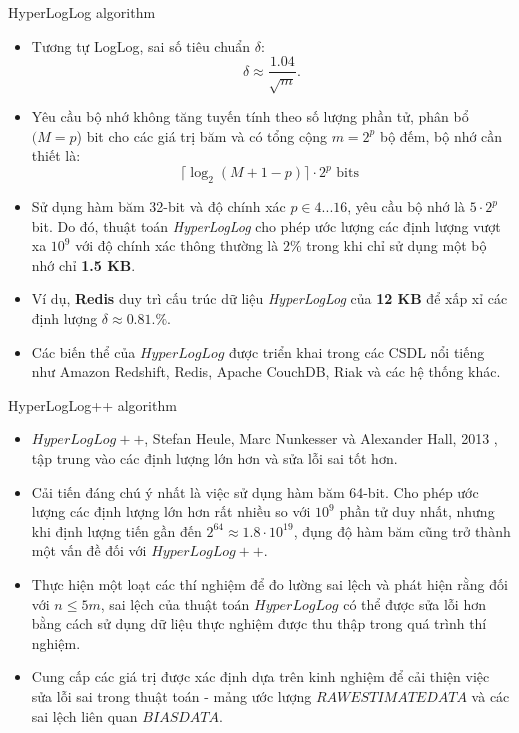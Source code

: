 \documentclass[10pt]{beamer}
\begin{document}
\begin{frame}{HyperLogLog algorithm}
\begin{itemize}
	\item Tương tự LogLog, sai số tiêu chuẩn $\delta$: \[\delta \approx \frac{1.04}{\sqrt{m}}.\]
	\item Yêu cầu bộ nhớ không tăng tuyến tính theo số lượng phần tử, phân bổ $(M=p$) bit cho các giá trị băm và có tổng cộng $m = 2^p$ bộ đếm, bộ nhớ cần thiết là:
  \[\lceil\log_2\left(M + 1 - p\right)\rceil\cdot2^p \text{ bits }\]
  \item Sử dụng hàm băm 32-bit và độ chính xác $p \in 4...16$, yêu cầu bộ nhớ là $5\cdot 2^p$ bit. Do đó, thuật toán \textit{HyperLogLog} cho phép ước lượng các định lượng vượt xa $10^9$ với độ chính xác thông thường là $2\%$ trong khi chỉ sử dụng một bộ nhớ chỉ \textbf{1.5 KB}.
  \item Ví dụ, \textbf{Redis} duy trì cấu trúc dữ liệu \textit{HyperLogLog} của \textbf{12 KB} để xấp xỉ các định lượng $\delta \approx 0.81.\%$.
  \item Các biến thể của $HyperLogLog$ được triển khai trong các CSDL nổi tiếng như Amazon Redshift, Redis, Apache CouchDB, Riak 
  và các hệ thống khác.
\end{itemize}
\end{frame}
\begin{frame}{HyperLogLog++ algorithm}
  \begin{itemize}
    \item $HyperLogLog++$, Stefan Heule, Marc Nunkesser và Alexander Hall, 2013 \cite{chabchoub2010sliding}, tập trung vào 
    các định lượng lớn hơn và sửa lỗi sai tốt hơn.
    \item Cải tiến đáng chú ý nhất là việc sử dụng hàm băm 64-bit. Cho phép 
    ước lượng các định lượng lớn hơn rất nhiều so với $10^9$ phần tử duy nhất, 
    nhưng khi định lượng tiến gần đến $2^{64} \approx 1.8\cdot 10^{19}$, 
    đụng độ hàm băm cũng trở thành một vấn đề đối với $HyperLogLog++$.
    \item Thực hiện một loạt các thí nghiệm để đo lường 
    sai lệch và phát hiện rằng đối với $n \le 5m$, sai lệch của thuật toán $HyperLogLog$ 
    có thể được sửa lỗi hơn bằng cách sử dụng dữ liệu thực nghiệm được thu thập 
    trong quá trình thí nghiệm.
    \item Cung cấp các giá trị được xác định dựa trên kinh nghiệm 
    để cải thiện việc sửa lỗi sai trong thuật toán - mảng ước lượng $RAWESTIMATEDATA$ và 
    các sai lệch liên quan $BIASDATA$.
  \end{itemize}
\end{frame}
\end{document}
